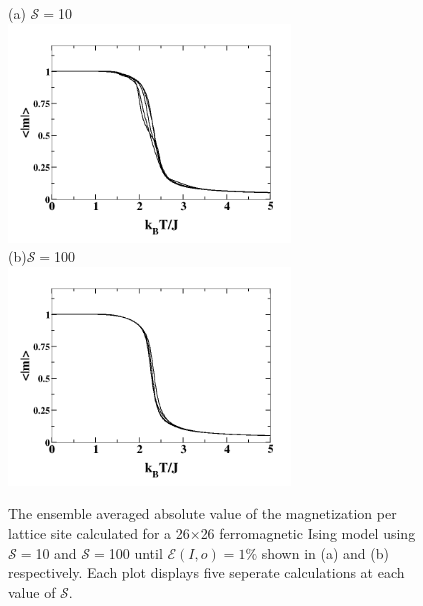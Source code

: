 \documentclass[aps,prl,reprint,superscriptaddress,showkeys]{revtex4-1}
\begin{document}
\begin{figure}
(a)\hspace{0.1cm} $\mathcal{S}=$10\\
\includegraphics[width=7.5cm]{M_vs_T_S10.png}\\
(b)\hspace{0.1cm}$\mathcal{S}=$100\\
\includegraphics[width=7.5cm]{M_vs_T_S100.png}
\caption{\label{avg_mag} The ensemble averaged absolute value of the magnetization per lattice site calculated for a 26$\times$26 ferromagnetic Ising model  using $\mathcal{S}=$10 and $\mathcal{S}=$100 until $\mathcal{E}(I,o)=1\%$ shown in (a) and (b) respectively. Each plot displays five seperate calculations at each value of $\mathcal{S}$.  }
\end{figure}
\end{document}
